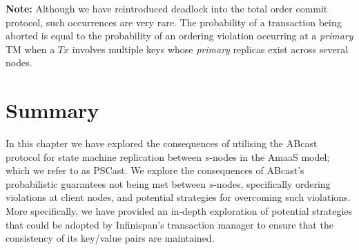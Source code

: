     \textbf{Note:} Although we have reintroduced deadlock into the total order commit protocol, such occurrences are very rare.  The probability of a transaction being aborted is equal to the probability of an ordering violation occurring at a \emph{primary} TM when a $Tx$ involves multiple keys whose \emph{primary} replicas exist across several nodes.  

\section{Summary}
In this chapter we have explored the consequences of utilising the \textsf{ABcast} protocol for state machine replication between $s$-nodes in the \textsf{AmaaS} model; which we refer to as \textsf{PSCast}.  We explore the consequences of \textsf{ABcast}'s probabilistic guarantees not being met between $s$-nodes, specifically ordering violations at client nodes, and potential strategies for overcoming such violations.  More specifically, we have provided an in-depth exploration of potential strategies that could be adopted by Infinispan's transaction manager to ensure that the consistency of its key/value pairs are maintained.  
